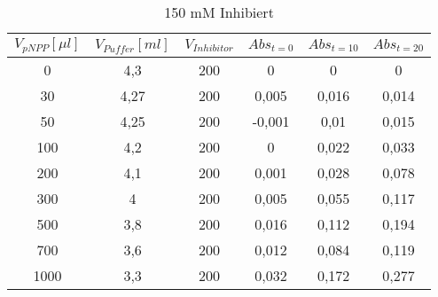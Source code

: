 \begin{table}[H]
  \centering
  \caption{150 mM Inhibiert}
    \begin{tabular}{cccccc}
    \midrule
    $V_{pNPP} [\mu l]$ & $V_{Puffer} [ml]$ & $V_{Inhibitor}$ &$Abs_{t=0}$ & $Abs_{t=10}$ & $Abs_{t=20}$\\
    \midrule
    0     & 4,3   & 200   & 0     & 0     & 0 \\
    30    & 4,27  & 200   & 0,005 & 0,016 & 0,014 \\
    50    & 4,25  & 200   & -0,001 & 0,01  & 0,015 \\
    100   & 4,2   & 200   & 0     & 0,022 & 0,033 \\
    200   & 4,1   & 200   & 0,001 & 0,028 & 0,078 \\
    300   & 4     & 200   & 0,005 & 0,055 & 0,117 \\
    500   & 3,8   & 200   & 0,016 & 0,112 & 0,194 \\
    700   & 3,6   & 200   & 0,012 & 0,084 & 0,119 \\
    1000  & 3,3   & 200   & 0,032 & 0,172 & 0,277 \\
    \bottomrule
    \end{tabular}%
  \label{tab:addlabel}%
\end{table}%